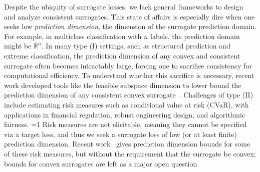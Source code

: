 \documentclass[11pt]{article} %
\newcommand{\Comments}{1}
\newcommand{\mytodo}[2]{\ifnum\Comments=1%
	\todo[linecolor=#1!80!black,backgroundcolor=#1,bordercolor=#1!80!black]{#2}\fi}
\newcommand{\jessiet}[1]{\mytodo{teal!20!white}{JF: #1}}
\newcommand{\reals}{\mathbb{R}}
\begin{document}
Despite the ubiquity of surrogate losses, we lack general frameworks to design and analyze consistent surrogates.
This state of affairs is especially dire when one seeks low \emph{prediction dimension}, the dimension of the surrogate prediction domain.
For example, in multiclass classification with $n$ labels, the prediction domain might be $\reals^n$.
In many type (I) settings, such as structured prediction and extreme classification, the prediction dimension of any convex and consistent surrogate often becomes intractably large, forcing one to sacrifice consistency for computational efficiency.
To understand whether this sacrifice is necessary, recent work developed tools like the feasible subspace dimension to lower bound the prediction dimension of any consistent convex surrogate~\citep{ramaswamy2016convex}.
Challenges of type (II) include estimating risk measures such as conditional value at risk (CVaR), with applications in financial regulation, robust engineering design, and algorithmic fairness.
\jessiet{cites?}
Risk measures are not elicitable, meaning they cannot be specified via a target loss, and thus we seek a surrogate loss of low (or at least finite) prediction dimension.
Recent work~\citep{fissler2016higher,frongillo2015elicitation,frongillo2020elicitation} gives prediction dimension bounds for some of these risk measures, but without the requirement that the surrogate be convex; bounds for convex surrogates are left as a major open question.
\end{document}
